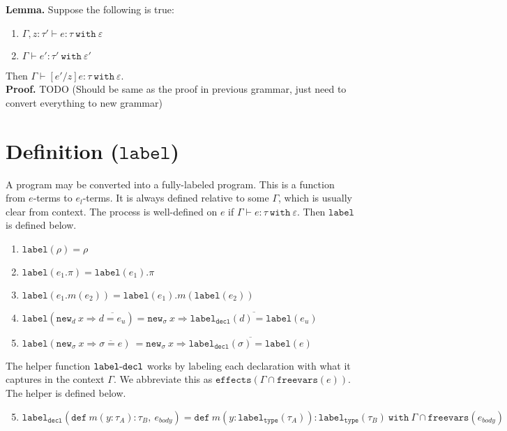 \documentclass{llncs}
\newcommand{\keywadj}[1]{\mathtt{#1}}
\newcommand{\keyw}[1]{\keywadj{#1}~}
\newcommand{\kw}[1]{\keyw{ #1 }}
\newcommand{\kwa}[1]{\keywadj{ #1 }}
\newcommand{\hyphen}{\hbox{-}}
\newcommand{\type}[2]{
	#1~\keyw{with} #2
}
\begin{document}
\textbf{Lemma. } Suppose the following is true: 

\begin{enumerate}
	\item $\Gamma, z : \tau' \vdash e : \tau~\keyw{with} \varepsilon$
	\item $\Gamma \vdash e' : \tau'~\keyw{with} \varepsilon'$
\end{enumerate}
	
	\noindent
Then $\Gamma \vdash [e'/z]e : \tau~\keyw{with} \varepsilon$.\\

\noindent
\textbf{Proof.} TODO (Should be same as the proof in previous grammar, just need to convert everything to new grammar)






\section{Definition ($\keywadj{label}$)}
A program may be converted into a fully-labeled program. This is a function from $e$-terms to $e_l$-terms. It is always defined relative to some $\Gamma$, which is usually clear from context. The process is well-defined on $e$ if $\Gamma \vdash e : \type{\tau}{\varepsilon}$. Then $\kwa{label}$ is defined below.

\begin{enumerate}
	\item $\kwa{label}(\rho) = \rho$
	\item $\kwa{label}(e_1.\pi) = \kwa{label}(e_1).\pi$
	\item $\kwa{label}(e_1.m(e_2)) = \kwa{label}(e_1).m(\kwa{label}(e_2))$
	\item $\kwa{label}(\kwa{new}_d~x \Rightarrow \overline{d = e_u}) = \kwa{new}_\sigma~x \Rightarrow
	\overline{ \kwa{label_{decl}}(d) = \kwa{label}(e_u) }$
	\item $\kwa{label}(\kwa{new}_\sigma~x \Rightarrow \overline{\sigma = e}) ~= \kwa{new}_\sigma~x \Rightarrow \overline{\kwa{label_{decl}}(\sigma) = \kwa{label}(e)}$
\end{enumerate}

\noindent
The helper function $\kwa{label \hyphen decl}$ works by labeling each declaration with what it captures in the context $\Gamma$. We abbreviate this as $\kwa{effects}(\Gamma \cap \kwa{freevars}(e))$. The helper is defined below.

\begin{enumerate}
  \setcounter{enumi}{4}
  \item $\kwa{label_{decl}}( \kw{def} m(y : \tau_A) : \tau_B,~e_{body}) = \kw{def} m(y : \kwa{label_{type}}(\tau_A)) : \kwa{label_{type}}(\tau_B)~\kw{with} \Gamma \cap \kwa{freevars}(e_{body})$
\end{enumerate}
\end{document}
